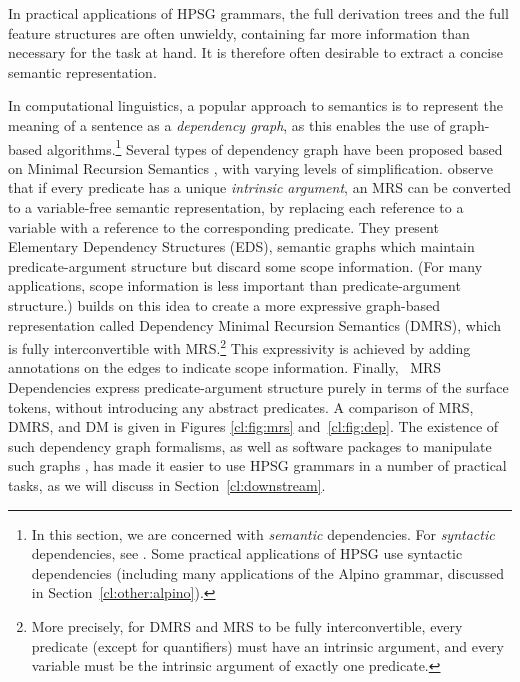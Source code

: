 \documentclass[output=paper,nonflat]{langsci/langscibook}
\begin{document}
In practical applications of HPSG grammars,
the full derivation trees and the full feature structures are often unwieldy,
containing far more information than necessary for the task at hand.
It is therefore often desirable to extract a concise semantic representation.

In computational linguistics,
a popular approach to semantics is to represent the meaning of a sentence as a \textit{dependency graph},
as this enables the use of graph-based algorithms.\footnote{%
	In this section, we are concerned with \emph{semantic} dependencies.
	For \emph{syntactic} dependencies, see .
	Some practical applications of HPSG use syntactic dependencies
	(including many applications of the Alpino grammar, discussed in Section~\ref{cl:other:alpino}).
}
Several types of dependency graph have been proposed
based on Minimal Recursion Semantics \citep[MRS;][]{CFPS2005a},
with varying levels of simplification.
\citet{oepen2006eds} observe that if every predicate has a unique
\textit{intrinsic argument}, an MRS can be converted to a variable-free semantic representation,
by replacing each reference to a variable with a reference to the corresponding predicate.
They present Elementary Dependency Structures (EDS),
semantic graphs which maintain predicate-argument structure but discard some scope information.
(For many applications, scope information is less important than predicate-argument structure.)
\citet{copestake2009dmrs} builds on this idea
to create a more expressive graph-based representation called
Dependency Minimal Recursion Semantics (DMRS),
which is fully interconvertible with MRS.\footnote{%
	More precisely, for DMRS and MRS to be fully interconvertible,
	every predicate (except for quantifiers) must have an intrinsic argument,
	and every variable must be the intrinsic argument of exactly one predicate.
} This expressivity is achieved by adding annotations on the edges to
indicate scope information.
Finally, \delphin\ MRS Dependencies \citep[DM;][]{ivanova2012dm}
express predicate-argument structure purely in terms of the surface tokens,
without introducing any abstract predicates.
A comparison of MRS, DMRS, and DM is given in Figures \ref{cl:fig:mrs} and~\ref{cl:fig:dep}.
The existence of such dependency graph formalisms,
as well as software packages to manipulate such graphs \citep{copestake2016pydmrs},
has made it easier to use HPSG grammars in a number of practical tasks,
as we will discuss in Section~\ref{cl:downstream}.
\end{document}
